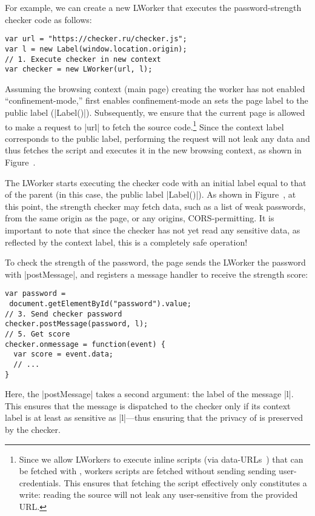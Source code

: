 For example, we can create a new LWorker that executes the
password-strength checker code as follows:
\begin{lstlisting}
var url = "https://checker.ru/checker.js";
var l = new Label(window.location.origin);
// 1. Execute checker in new context
var checker = new LWorker(url, l);
\end{lstlisting}
%
Assuming the browsing context (main page) creating the worker has not
enabled ``confinement-mode,'' \sys{} first enables confinement-mode an
sets the page label to the public label (\js|Label()|).
%
Subsequently, we ensure that the current page is allowed to make a
request to \js|url| to fetch the source code.\footnote{
  Since we allow LWorkers to execute inline scripts (via
  data-URLs~) that can be fetched with \xhr{},
  workers scripts are fetched without sending sending
  user-credentials.  This ensures that fetching the script effectively
  only constitutes a write: reading the source will not leak any
  user-sensitive from the provided URL.
}
%
Since the context label corresponds to the public label, performing
the request will not leak any data and thus \sys{} fetches the script
and executes it in the new browsing context, as shown in
Figure~.

The LWorker starts executing the checker code with an initial label
equal to that of the parent (in this case, the public label
\js|Label()|).
%
As shown in Figure~, at this point, the strength
checker may fetch data, such as a list of weak passwords, from the
same origin as the page, or any origins, CORS-permitting.
%
It is important to note that since the checker has not yet read any
sensitive data, as reflected by the context label, this is a
completely safe operation!

To check the strength of the password, the page sends the LWorker the
password with \js|postMessage|, and registers a message handler to
receive the strength score:
\begin{lstlisting}
var password = 
 document.getElementById("password").value;
// 3. Send checker password 
checker.postMessage(password, l);
// 5. Get score
checker.onmessage = function(event) {
  var score = event.data; 
  // ...
}
\end{lstlisting}
Here, the \js|postMessage| takes a second argument: the label of the
message \js|l|.
%
This ensures that the message is dispatched to the checker only if its
context label is at least as sensitive as \js|l|---thus ensuring
that the privacy of  is preserved by the checker.

